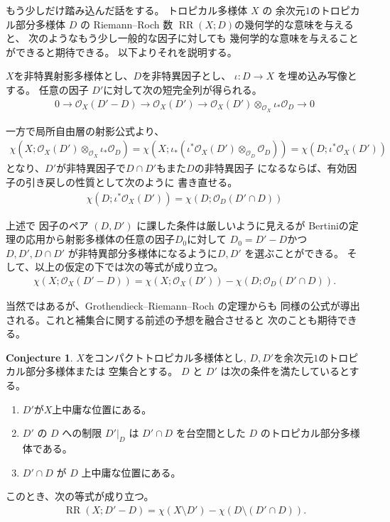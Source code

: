 \documentclass[a4paper,dvipdfmx,reqno,12pt]{amsart}
\theoremstyle{definition}
\newtheorem{conjecture}[theorem]{Conjecture}
\newcommand{\opn}[1]{\operatorname{#1}}
\numberwithin{equation}{section}
\begin{document}
もう少しだけ踏み込んだ話をする。
トロピカル多様体 $X$ の
余次元$1$のトロピカル部分多様体 $D$ の
Riemann--Roch 数
$\opn{RR}(X;D)$の幾何学的な意味を与えると、
次のようなもう少し一般的な因子に対しても
幾何学的な意味を与えることができると期待できる。
以下よりそれを説明する。

$X$を非特異射影多様体とし、$D$を非特異因子とし、
$\iota\colon D\to X$ を埋め込み写像とする。
任意の因子 $D'$に対して次の短完全列が得られる。
\begin{align}
0 \to \mathcal{O}_X(D'-D)\to \mathcal{O}_X(D')
\to \mathcal{O}_X(D')
\otimes_{\mathcal{O}_X} \iota_*\mathcal{O}_D \to 0 
\end{align}

一方で局所自由層の射影公式より、
\begin{align}
\chi(X;\mathcal{O}_X(D')\otimes_{\mathcal{O}_X} \iota_*\mathcal{O}_D)
=\chi(X;\iota_*(\iota^{*}\mathcal{O}_X(D')\otimes_{\mathcal{O}_D} \mathcal{O}_D))
=\chi(D;\iota^{*}\mathcal{O}_X(D'))
\end{align}
となり、$D'$が非特異因子で$D\cap D'$もまた$D$の非特異因子
になるならば、有効因子の引き戻しの性質として次のように
書き直せる。
\begin{align}
\chi(D;\iota^{*}\mathcal{O}_X(D'))=\chi(D;\mathcal{O}_D(D'\cap D))
\end{align}

上述で 因子のペア $(D,D')$ に課した条件は厳しいように見えるが
Bertiniの定理の応用から射影多様体の任意の因子$D_0$に対して
$D_0=D'-D$かつ
$D,D',D\cap D'$ が非特異部分多様体になるように$D,D'$
を選ぶことができる。
そして、以上の仮定の下では次の等式が成り立つ。
\begin{align}
\chi(X;\mathcal{O}_X(D'-D))=
\chi(X;\mathcal{O}_X(D'))-
\chi(D;\mathcal{O}_D(D'\cap D)).
\end{align}

当然ではあるが、Grothendieck--Riemann--Roch の定理からも
同様の公式が導出される。これと補集合に関する前述の予想を融合させると
次のことも期待できる。

\begin{conjecture}
\label{conjecture-rr-bertini}
$X$をコンパクトトロピカル多様体とし, 
$D,D'$を余次元$1$のトロピカル部分多様体または
空集合とする。
$D$ と $D'$ は次の条件を満たしているとする。
\begin{enumerate}
\item $D'$が$X$上中庸な位置にある。
\item $D'$ の $D$ への制限 $D'|_{D}$ は 
$D'\cap D$ を台空間とした $D$ のトロピカル部分多様体である。
\item $D'\cap D$ が $D$ 上中庸な位置にある。
\end{enumerate}
このとき、次の等式が成り立つ。
\begin{align}
\label{equation-rr-bertini}
\opn{RR}(X;D'-D)=\chi (X\setminus D')-
\chi(D\setminus (D'\cap D)).
\end{align}

\end{conjecture}
\end{document}
